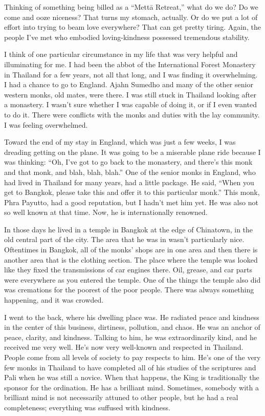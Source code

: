 Thinking of something being billed as a “Mettā Retreat,” what do we do?
Do we come and ooze niceness? That turns my stomach, actually. Or do we
put a lot of effort into trying to beam love everywhere? That can get
pretty tiring. Again, the people I’ve met who embodied loving-kindness
possessed tremendous stability.

I think of one particular circumstance in my life that was very helpful
and illuminating for me. I had been the abbot of the International
Forest Monastery in Thailand for a few years, not all that long, and I
was finding it overwhelming. I had a chance to go to England. Ajahn
Sumedho and many of the other senior western monks, old mates, were
there. I was still stuck in Thailand looking after a monastery. I wasn’t
sure whether I was capable of doing it, or if I even wanted to do it.
There were conflicts with the monks and duties with the lay community. I
was feeling overwhelmed.

Toward the end of my stay in England, which was just a few weeks, I was
dreading getting on the plane. It was going to be a miserable plane ride
because I was thinking: “Oh, I’ve got to go back to the monastery, and
there’s this monk and that monk, and blah, blah, blah.” One of the
senior monks in England, who had lived in Thailand for many years, had a
little package. He said, “When you get to Bangkok, please take this and
offer it to this particular monk.” This monk, Phra Payutto, had a good
reputation, but I hadn’t met him yet. He was also not so well known at
that time. Now, he is internationally renowned.

In those days he lived in a temple in Bangkok at the edge of Chinatown,
in the old central part of the city. The area that he was in wasn’t
particularly nice. Oftentimes in Bangkok, all of the monks’ shops are in
one area and then there is another area that is the clothing section.
The place where the temple was looked like they fixed the transmissions
of car engines there. Oil, grease, and car parts were everywhere as you
entered the temple. One of the things the temple also did was cremations
for the poorest of the poor people. There was always something
happening, and it was crowded.

I went to the back, where his dwelling place was. He radiated peace and
kindness in the center of this business, dirtiness, pollution, and
chaos. He was an anchor of peace, clarity, and kindness. Talking to him,
he was extraordinarily kind, and he received me very well. He’s now very
well-known and respected in Thailand. People come from all levels of
society to pay respects to him. He’s one of the very few monks in
Thailand to have completed all of his studies of the scriptures and Pali
when he was still a novice. When that happens, the King is traditionally
the sponsor for the ordination. He has a brilliant mind. Sometimes,
somebody with a brilliant mind is not necessarily attuned to other
people, but he had a real completeness; everything was suffused with
kindness.

